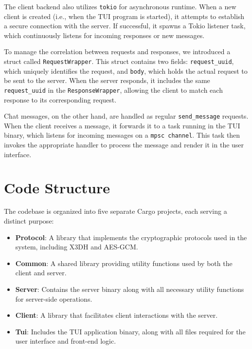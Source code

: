 The client backend also utilizes \texttt{tokio} for asynchronous runtime. When a new client is created (i.e., when the TUI program is started), it attempts to establish a secure connection with the server. If successful, it spawns a Tokio listener task, which continuously listens for incoming responses or new messages.  

To manage the correlation between requests and responses, we introduced a struct called \texttt{RequestWrapper}. This struct contains two fields: \texttt{request\_uuid}, which uniquely identifies the request, and \texttt{body}, which holds the actual request to be sent to the server. When the server responds, it includes the same \texttt{request\_uuid} in the \texttt{ResponseWrapper}, allowing the client to match each response to its corresponding request.  

Chat messages, on the other hand, are handled as regular \texttt{send\_message} requests. When the client receives a message, it forwards it to a task running in the TUI binary, which listens for incoming messages on a \texttt{mpsc channel}. This task then invokes the appropriate handler to process the message and render it in the user interface.
\newpage
\section{Code Structure}
\label{sec:CodeStructure}


The codebase is organized into five separate Cargo projects, each serving a distinct purpose:

\begin{itemize}
    \item \textbf{Protocol}: A library that implements the cryptographic protocols used in the system, including X3DH and AES-GCM.
    \item \textbf{Common}: A shared library providing utility functions used by both the client and server.
    \item \textbf{Server}: Contains the server binary along with all necessary utility functions for server-side operations.
    \item \textbf{Client}: A library that facilitates client interactions with the server.
    \item \textbf{Tui}: Includes the TUI application binary, along with all files required for the user interface and front-end logic.
\end{itemize}

